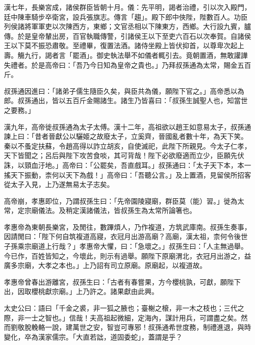 \begin{pinyinscope}
漢七年，長樂宮成，諸侯群臣皆朝十月。儀：先平明，謁者治禮，引以次入殿門，廷中陳車騎步卒衛宮，設兵張旗志。傳言「趨」。殿下郎中俠陛，陛數百人。功臣列侯諸將軍軍吏以次陳西方，東鄉；文官丞相以下陳東方，西鄉。大行設九賓，臚傳。於是皇帝輦出房，百官執職傳警，引諸侯王以下至吏六百石以次奉賀。自諸侯王以下莫不振恐肅敬。至禮畢，復置法酒。諸侍坐殿上皆伏抑首，以尊卑次起上壽。觴九行，謁者言「罷酒」。御史執法舉不如儀者輒引去。竟朝置酒，無敢讙譁失禮者。於是高帝曰：「吾乃今日知為皇帝之貴也。」乃拜叔孫通為太常，賜金五百斤。

叔孫通因進曰：「諸弟子儒生隨臣久矣，與臣共為儀，願陛下官之。」高帝悉以為郎。叔孫通出，皆以五百斤金賜諸生。諸生乃皆喜曰：「叔孫生誠聖人也，知當世之要務。」

漢九年，高帝徙叔孫通為太子太傅。漢十二年，高祖欲以趙王如意易太子，叔孫通諫上曰：「昔者晉獻公以驪姬之故廢太子，立奚齊，晉國亂者數十年，為天下笑。秦以不蚤定扶蘇，令趙高得以詐立胡亥，自使滅祀，此陛下所親見。今太子仁孝，天下皆聞之；呂后與陛下攻苦食啖，其可背哉！陛下必欲廢適而立少，臣願先伏誅，以頸血汙地。」高帝曰：「公罷矣，吾直戲耳。」叔孫通曰：「太子天下本，本一搖天下振動，柰何以天下為戲！」高帝曰：「吾聽公言。」及上置酒，見留侯所招客從太子入見，上乃遂無易太子志矣。

高帝崩，孝惠即位，乃謂叔孫生曰：「先帝園陵寢廟，群臣莫（能）習。」徙為太常，定宗廟儀法。及稍定漢諸儀法，皆叔孫生為太常所論箸也。

孝惠帝為東朝長樂宮，及閒往，數蹕煩人，乃作複道，方筑武庫南。叔孫生奏事，因請閒曰：「陛下何自筑複道高寢，衣冠月出游高廟？高廟，漢太祖，柰何令後世子孫乘宗廟道上行哉？」孝惠帝大懼，曰：「急壞之。」叔孫生曰：「人主無過舉。今已作，百姓皆知之，今壞此，則示有過舉。願陛下原廟渭北，衣冠月出游之，益廣多宗廟，大孝之本也。」上乃詔有司立原廟。原廟起，以複道故。

孝惠帝曾春出游離宮，叔孫生曰：「古者有春嘗果，方今櫻桃孰，可獻，願陛下出，因取櫻桃獻宗廟。」上乃許之。諸果獻由此興。

太史公曰：語曰「千金之裘，非一狐之腋也；臺榭之榱，非一木之枝也；三代之際，非一士之智也。」信哉！夫高祖起微細，定海內，謀計用兵，可謂盡之矣。然而劉敬脫輓輅一說，建萬世之安，智豈可專邪！叔孫通希世度務，制禮進退，與時變化，卒為漢家儒宗。「大直若詘，道固委蛇」，蓋謂是乎？


\end{pinyinscope}